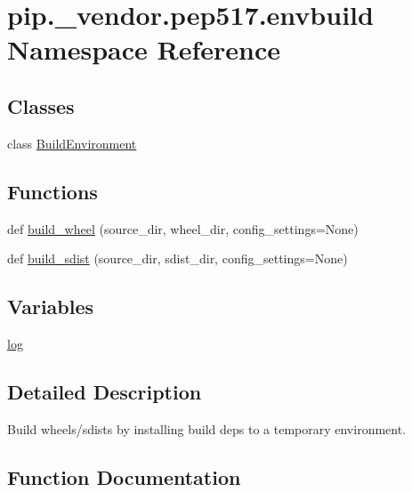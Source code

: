 \hypertarget{namespacepip_1_1__vendor_1_1pep517_1_1envbuild}{}\section{pip.\+\_\+vendor.\+pep517.\+envbuild Namespace Reference}
\label{namespacepip_1_1__vendor_1_1pep517_1_1envbuild}
\subsection*{Classes}
\begin{DoxyCompactItemize}
\item 
class \hyperlink{classpip_1_1__vendor_1_1pep517_1_1envbuild_1_1BuildEnvironment}{Build\+Environment}
\end{DoxyCompactItemize}
\subsection*{Functions}
\begin{DoxyCompactItemize}
\item 
def \hyperlink{namespacepip_1_1__vendor_1_1pep517_1_1envbuild_af765376719840d88237aff568acf11ec}{build\+\_\+wheel} (source\+\_\+dir, wheel\+\_\+dir, config\+\_\+settings=None)
\item 
def \hyperlink{namespacepip_1_1__vendor_1_1pep517_1_1envbuild_a1e0d2215d76982b15957ebb74c7d8ee7}{build\+\_\+sdist} (source\+\_\+dir, sdist\+\_\+dir, config\+\_\+settings=None)
\end{DoxyCompactItemize}
\subsection*{Variables}
\begin{DoxyCompactItemize}
\item 
\hyperlink{namespacepip_1_1__vendor_1_1pep517_1_1envbuild_ae935ca4c3ccc5f9a1506a0a5c8e9c53d}{log}
\end{DoxyCompactItemize}


\subsection{Detailed Description}
\begin{DoxyVerb}Build wheels/sdists by installing build deps to a temporary environment.
\end{DoxyVerb}
 

\subsection{Function Documentation}
\mbox{\label{namespacepip_1_1__vendor_1_1pep517_1_1envbuild_a1e0d2215d76982b15957ebb74c7d8ee7}} 
